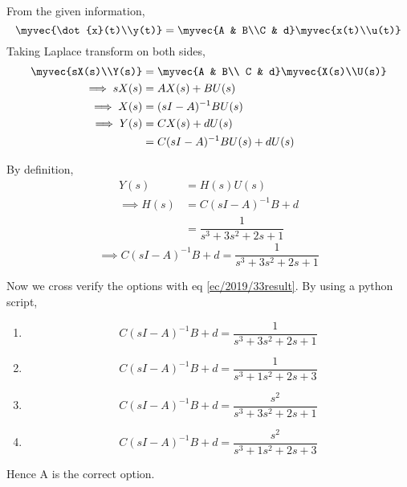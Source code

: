 From the given information, 
\begin{equation}
    \myvec{\dot{x}(t)\\y(t)} = \myvec{A & B\\C & d}\myvec{x(t)\\u(t)}
\end{equation}
%    
Taking Laplace transform on both sides,
\begin{align}
    \myvec{sX(s)\\Y(s)} &= \myvec{A & B\\ C & d}\myvec{X(s)\\U(s)}\\
    \implies sX(s) &= AX(s)+BU(s)\\
    \implies X(s) &= (sI-A)^{-1} BU(s)\\
    \implies Y(s) &= CX(s)+dU(s)\\ 
                  &= C(sI-A)^{-1} BU(s) +dU(s)
\end{align}

By definition, 
\begin{align}
    Y(s) &= H(s)U(s)\\
    \implies H(s) &= C(sI-A)^{-1} B + d\\
                  &= \dfrac{1}{s^3+3s^2+2s+1}
\end{align} 
\begin{equation}
    \implies C(sI-A)^{-1} B + d = \dfrac{1}{s^3+3s^2+2s+1}\label{ec/2019/33result}
\end{equation}

Now we cross verify the options with eq \ref{ec/2019/33result}. By using a python script, 
\begin{enumerate}[label = (\Alph*)]
    \item \begin{equation}
        C(sI-A)^{-1} B +d = \dfrac{1}{s^3+3s^2+2s+1}
    \end{equation}
    \item \begin{equation}
        C(sI-A)^{-1} B +d = \dfrac{1}{s^3+1s^2+2s+3}
    \end{equation}    
    \item \begin{equation}
        C(sI-A)^{-1} B +d = \dfrac{s^2}{s^3+3s^2+2s+1}
    \end{equation}
    \item \begin{equation}
        C(sI-A)^{-1} B +d = \dfrac{s^2}{s^3+1s^2+2s+3}
    \end{equation}
\end{enumerate}

Hence  A is the correct option.

